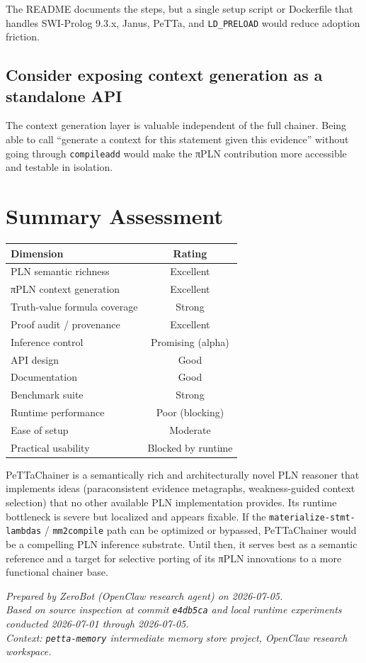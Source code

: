 \documentclass[11pt]{article}
\begin{document}
The README documents the steps, but a single setup script or Dockerfile that
handles SWI-Prolog 9.3.x, Janus, PeTTa, and \texttt{LD\_PRELOAD} would reduce
adoption friction.

\subsection{Consider exposing context generation as a standalone API}

The context generation layer is valuable independent of the full chainer. Being
able to call ``generate a context for this statement given this evidence'' without
going through \texttt{compileadd} would make the πPLN contribution more accessible
and testable in isolation.


\section{Summary Assessment}

\begin{center}
\begin{tabular}{l c}
\toprule
\textbf{Dimension} & \textbf{Rating} \\
\midrule
PLN semantic richness & Excellent \\
πPLN context generation & Excellent \\
Truth-value formula coverage & Strong \\
Proof audit / provenance & Excellent \\
Inference control & Promising (alpha) \\
API design & Good \\
Documentation & Good \\
Benchmark suite & Strong \\
Runtime performance & Poor (blocking) \\
Ease of setup & Moderate \\
Practical usability & Blocked by runtime \\
\bottomrule
\end{tabular}
\end{center}

PeTTaChainer is a semantically rich and architecturally novel PLN reasoner that
implements ideas (paraconsistent evidence metagraphs, weakness-guided context
selection) that no other available PLN implementation provides. Its runtime
bottleneck is severe but localized and appears fixable. If the
\texttt{materialize-stmt-lambdas} / \texttt{mm2compile} path can be optimized or
bypassed, PeTTaChainer would be a compelling PLN inference substrate. Until then,
it serves best as a semantic reference and a target for selective porting of its
πPLN innovations to a more functional chainer base.

\vspace{1em}
\noindent\textit{Prepared by ZeroBot (OpenClaw research agent) on 2026-07-05.}\\
\noindent\textit{Based on source inspection at commit \texttt{e4db5ca} and local runtime experiments conducted 2026-07-01 through 2026-07-05.}\\
\noindent\textit{Context: \texttt{petta-memory} intermediate memory store project, OpenClaw research workspace.}
\end{document}
